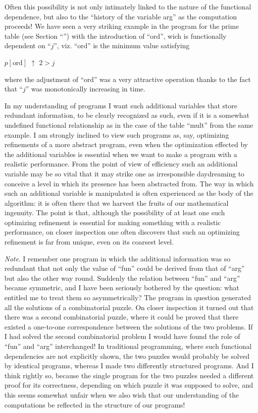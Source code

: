 Often this possibility is not only intimately linked to the nature of the functional dependence, but also to the ``history of the variable arg'' as the computation proceeds! We have seen a very striking example in the program for the prime table (see Section ``'') with the introduction of ``ord'', wich is functionally dependent on ``$j$'', viz. ``ord'' is the minimum value satisfying
\medskip

{
	\setlength{\parindent}{8em}
	$p[\text{ord}]$ $\uparrow$ $2 > j$
}
\medskip

\noindent
where the adjustment of ``ord'' was a very attractive operation thanks to the fact that ``$j$'' was monotonically increasing in time.

In my understanding of programs I want such additional variables that store redundant information, to be clearly recognized as such, even if it is a somewhat undefined functional relationship as in the case of the table ``mult'' from the same example. I am strongly inclined to view such programs as, say, optimizing refinements of a more abstract program, even when the optimization effected by the additional variables is essential when we want to make a program with a realistic performance. From the point of view of efficiency such an additional variable may be so vital that it may strike one as irresponsible daydreaming to conceive a level in which its presence has been abstracted from. The way in which such an additional variable is manipulated is often experienced as the body of the algorithm: it is often there that we harvest the fruits of our mathematical ingenuity. The point is that, although the possibility of at least one such optimizing refinement is essential for making something with a realistic performance, on closer inspection one often discovers that such an optimizing refinement is far from unique, even on its coarsest level.

\noindent
\textit{Note}. I remember one program in which the additional information was so redundant that not only the value of ``fun'' could be derived from that of ``arg'' but also the other way round. Suddenly the relation between ``fun'' and ``arg'' became symmetric, and I have been seriously bothered by the question: what entitled me to treat them so asymmetrically? The program in question generated all the solutions of a combinatorial puzzle. On closer inspection it turned out that there was a second combinatorial puzzle, where it could be proved that there existed a one-to-one correspondence between the solutions of the two problems. If I had solved the second combinatorial problem I would have found the role of ``fun'' and ``arg'' interchanged! In traditional programming, where such functional dependencies are not explicitly shown, the two puzzles would probably be solved by identical programs, whereas I made two differently structured programs. And I think rightly so, because the single program for the two puzzles needed a different proof for its correctness, depending on which puzzle it was supposed to solve, and this seems somewhat unfair when we also wish that our understanding of the computations be reflected in the structure of our programs!

